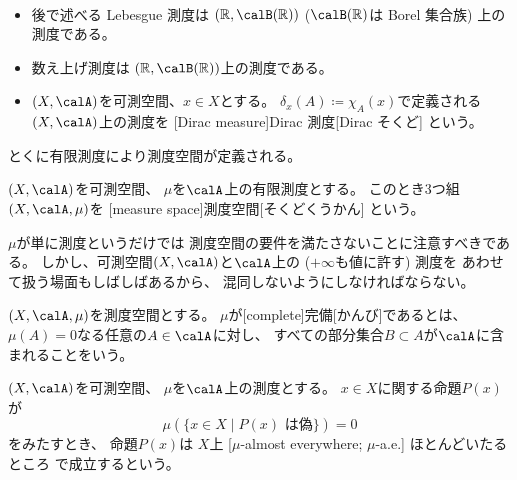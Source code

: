 \documentclass[report]{jlreq}
\begin{document}
\begin{example}[測度の例]
    ~
    \begin{itemize}
        \item 後で述べる Lebesgue 測度は
            $(\R, \calB(\R))$ ($\calB(\R)$は Borel 集合族)
            上の測度である。
        \item 数え上げ測度は
            $(\R, \calB(\R))$上の測度である。
        \item $(X, \calA)$を可測空間、$x \in X$とする。
            $\delta_x(A) \coloneqq \chi_A(x)$で定義される
            $(X, \calA)$上の測度を
            [Dirac measure]{Dirac 測度}[Dirac そくど]
            という。
    \end{itemize}
\end{example}

とくに有限測度により測度空間が定義される。

\begin{definition}[測度空間]
    $(X, \calA)$を可測空間、
    $\mu$を$\calA$上の有限測度とする。
    このとき3つ組$(X, \calA, \mu)$を
    [measure space]{測度空間}[そくどくうかん]
    という。
\end{definition}

\begin{remark}
    $\mu$が単に測度というだけでは
    測度空間の要件を満たさないことに注意すべきである。
    しかし、可測空間$(X, \calA)$と$\calA$上の ($+\infty$も値に許す) 測度を
    あわせて扱う場面もしばしばあるから、
    混同しないようにしなければならない。
\end{remark}

\begin{definition}[完備な測度]
    $(X, \calA, \mu)$を測度空間とする。
    $\mu$が[complete]{完備}[かんび]であるとは、
    $\mu(A) = 0$なる任意の$A \in \calA$に対し、
    すべての部分集合$B \subset A$が$\calA$に含まれることをいう。
\end{definition}

\begin{definition}[ほとんどいたるところ]
    $(X, \calA)$を可測空間、
    $\mu$を$\calA$上の測度とする。
    $x \in X$に関する命題$P(x)$が
    \begin{equation}
        \mu(\{ x \in X \mid P(x) \text{ は偽} \}) = 0
    \end{equation}
    をみたすとき、
    命題$P(x)$は
    $X$上
    [$\mu$-almost everywhere; $\mu$-a.e.]
        {ほとんどいたるところ}
    で成立するという。
\end{definition}
\end{document}
